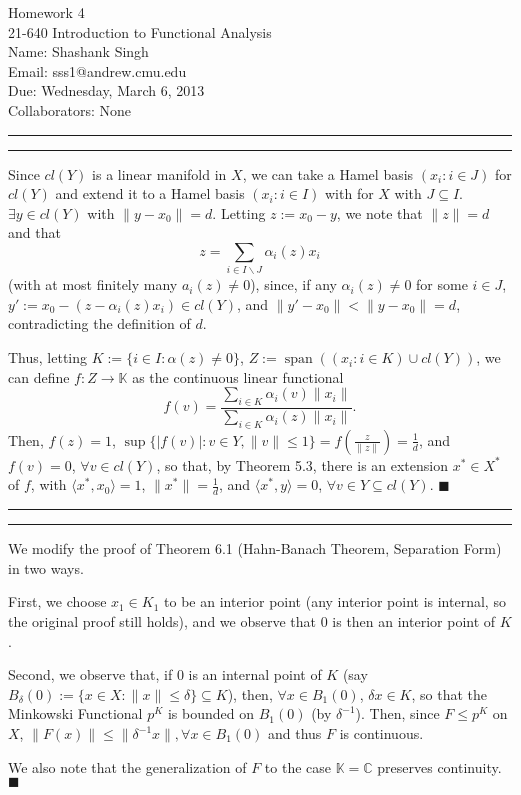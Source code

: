 \documentclass[11pt]{article}
\makeatletter
\newcounter{questionCounter}
\newcounter{partCounter}[questionCounter]
\newenvironment{question}[2][\arabic{questionCounter}]{%
    \setcounter{partCounter}{0}%
    \vspace{.25in} \hrule \vspace{0.5em}%
        \noindent{\bf #2}%
    \vspace{0.8em} \hrule \vspace{.10in}%
    \addtocounter{questionCounter}{1}%
}{}
\newcommand{\myname}{Shashank Singh}
\newcommand{\myandrew}{sss1@andrew.cmu.edu}
\newcommand{\myclass}{21-640 Introduction to Functional Analysis}
\newcommand{\myhwnum}{4}
\newcommand{\duedate}{Wednesday, March 6, 2013}
\newcommand{\mycollaborators}{None}
\renewcommand{\qed}{\quad $\blacksquare$}
\newcommand{\inv}{^{-1}}
\renewcommand{\sp}{\operatorname{span}} %
\newcommand{\sminus}{\backslash}
\newcommand{\K}{\mathbb{K}} %
\makeatother
\begin{document}
\thispagestyle{plain}

{\Large Homework \myhwnum} \\
\myclass \\
Name: \myname \\
Email: \myandrew \\
Due: \duedate \\
Collaborators: \mycollaborators

\begin{question}{Problem 2}
Since $cl(Y)$ is a linear manifold in $X$, we can take a Hamel basis
$(x_i : i \in J)$ for $cl(Y)$ and extend it to a Hamel basis $(x_i : i \in I)$
with for $X$ with $J \subseteq I$. $\exists y \in cl(Y)$ with
$\|y - x_0\| = d$. Letting $z := x_0 - y$, we note that $\|z\| = d$ and that
\[z = \sum_{i \in I \sminus J} \alpha_i(z) x_i\] (with at most finitely many
$a_i(z) \neq 0$), since, if any $\alpha_i(z) \neq 0$ for some $i \in J$,
$y' := x_0 - (z - \alpha_i(z)x_i) \in cl(Y)$, and
$\|y' - x_0\| < \|y - x_0\| = d$, contradicting the definition of $d$.

Thus, letting $K := \{i \in I : \alpha(z) \neq 0\}$,
$Z := \sp((x_i : i \in K) \cup cl(Y))$, we can define $f : Z \rightarrow \K$
as the continuous linear functional
\[f(v) = \frac{\sum_{i \in K} \alpha_i(v)\|x_i\|}
              {\sum_{i \in K} \alpha_i(z)\|x_i\|}.
\]
Then, $f(z) = 1$, $\sup\{|f(v)| : v \in Y, \|v\| \leq 1\} =
f\left( \frac{z}{\|z\|} \right) = \frac1d$, and $f(v) = 0$, $\forall v \in
cl(Y)$, so that, by Theorem 5.3, there is an extension $x^* \in X^*$ of $f$,
with $\langle x^*,x_0\rangle = 1$, $\|x^*\| = \frac1d$, and
$\langle x^*, y\rangle = 0$, $\forall v \in Y \subseteq cl(Y)$. \qed
\end{question}

\begin{question}{Problem 3}
We modify the proof of Theorem 6.1 (Hahn-Banach Theorem, Separation Form) in
two ways.

First, we choose $x_1 \in K_1$ to be an interior point (any interior point is
internal, so the original proof still holds), and we observe that $0$ is then
an interior point of $K$.

Second, we observe that, if $0$ is an internal point of $K$ (say
$B_{\delta}(0) := \{x \in X : \|x\| \leq \delta\} \subseteq K$), then,
$\forall x \in B_1(0)$, $\delta x \in K$, so that the Minkowski Functional
$p^K$ is bounded on $B_1(0)$ (by $\delta\inv$). Then, since $F \leq p^K$ on
$X$, $\|F(x)\| \leq \|\delta\inv x\|, \forall x \in B_1(0)$ and thus $F$ is
continuous.

We also note that the generalization of $F$ to the case $\K = \mathbb{C}$
preserves continuity. \qed
\end{question}
\end{document}
